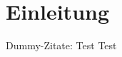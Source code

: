 \chapter{Einleitung}

Dummy-Zitate:
Test \cite{wuthrich-iros-2013}
\newline
Test \cite{jan_ICRA_2016}